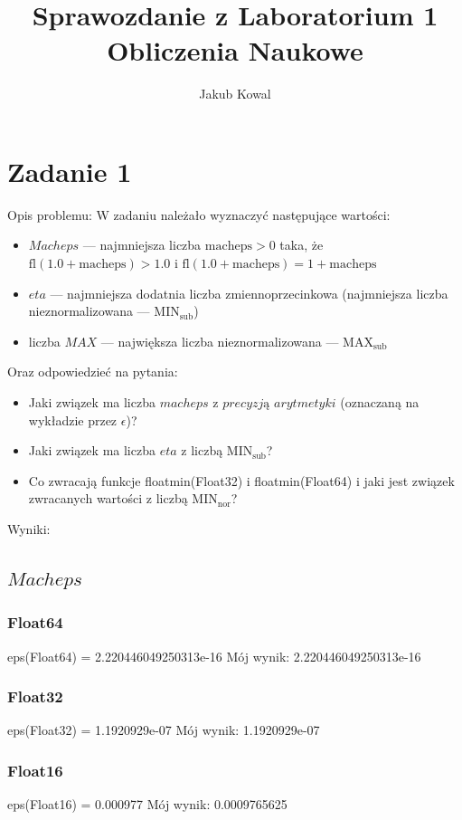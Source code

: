 \documentclass{article}
\title{Sprawozdanie z Laboratorium 1 \\ Obliczenia Naukowe}
\author{Jakub Kowal}
\begin{document}
\section{Zadanie 1}
Opis problemu:
W zadaniu należało wyznaczyć następujące wartości:
\begin{itemize}
    \item $Macheps$ --- najmniejsza liczba $\mathrm{macheps}>0$ taka, że $\mathrm{fl}(1.0+\mathrm{macheps})>1.0$ i $\mathrm{fl}(1.0+\mathrm{macheps})=1+\mathrm{macheps}$
    \item $eta$ --- najmniejsza dodatnia liczba zmiennoprzecinkowa (najmniejsza liczba nieznormalizowana --- $\mathrm{MIN}_{\mathrm{sub}}$)
    \item liczba $MAX$ --- największa liczba nieznormalizowana --- $\mathrm{MAX}_{\mathrm{sub}}$
\end{itemize}
Oraz odpowiedzieć na pytania:
\begin{itemize}
    \item Jaki związek ma liczba $macheps$ z $precyzją$ $arytmetyki$ (oznaczaną na wykładzie przez $\epsilon$)?
    \item Jaki związek ma liczba $eta$ z liczbą $\mathrm{MIN}_{\mathrm{sub}}$?
    \item Co zwracają funkcje floatmin(Float32) i floatmin(Float64) i jaki jest związek zwracanych wartości z liczbą $\mathrm{MIN}_{\mathrm{nor}}$?
\end{itemize}
Wyniki:
\subsection{$Macheps$}
\subsubsection{Float64}
eps(Float64) = 2.220446049250313e-16 \newline
Mój wynik: 2.220446049250313e-16 \newline
\subsubsection{Float32}
eps(Float32) = 1.1920929e-07 \newline
Mój wynik: 1.1920929e-07 \newline
\subsubsection{Float16}
eps(Float16) = 0.000977 \newline
Mój wynik: 0.0009765625 \newline
\end{document}
